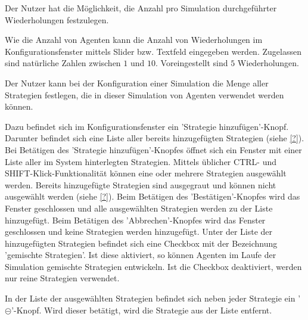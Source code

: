 \documentclass[parskip=full,11pt]{scrartcl}
\begin{document}
Der Nutzer hat die Möglichkeit, die Anzahl pro Simulation durchgeführter Wiederholungen festzulegen.

Wie die Anzahl von Agenten kann die Anzahl von Wiederholungen im Konfigurationsfenster mittels Slider bzw. Textfeld eingegeben werden. Zugelassen sind natürliche Zahlen zwischen \(1\) und \(10\). Voreingestellt sind \(5\) Wiederholungen.

Der Nutzer kann bei der Konfiguration einer Simulation die Menge aller Strategien festlegen, die in dieser Simulation von Agenten verwendet werden können.

Dazu befindet sich im Konfigurationsfenster ein 'Strategie hinzufügen'-Knopf. Darunter befindet sich eine Liste aller bereits hinzugefügten Strategien (siehe \cref{?}). Bei Betätigen des 'Strategie hinzufügen'-Knopfes öffnet sich ein Fenster mit einer Liste aller im System hinterlegten Strategien. Mittels üblicher \textsf{CTRL}- und \textsf{SHIFT}-Klick-Funktionalität können eine oder mehrere Strategien ausgewählt werden. Bereits hinzugefügte Strategien sind ausgegraut und können nicht ausgewählt werden (siehe \cref{?}). Beim Betätigen des 'Bestätigen'-Knopfes wird das Fenster geschlossen und alle ausgewählten Strategien werden zu der Liste hinzugefügt. Beim Betätigen des 'Abbrechen'-Knopfes wird das Fenster geschlossen und keine Strategien werden hinzugefügt. Unter der Liste der hinzugefügten Strategien befindet sich eine Checkbox mit der Bezeichnung 'gemischte Strategien'. Ist diese aktiviert, so können Agenten im Laufe der Simulation gemischte Strategien entwickeln. Ist die Checkbox deaktiviert, werden nur reine Strategien verwendet.

In der Liste der ausgewählten Strategien befindet sich neben jeder Strategie ein '\(\circleddash\)'-Knopf. Wird dieser betätigt, wird die Strategie aus der Liste entfernt.
\end{document}
